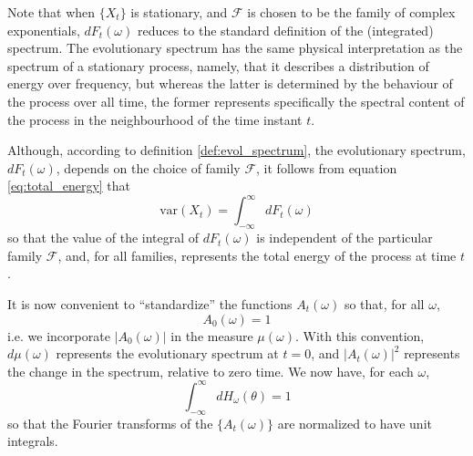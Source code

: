 \documentclass{article}
\begin{document}
Note that when $\{X_t \}$ is stationary, and $\mathscr{F}$ is chosen to be the
family of complex exponentials, $dF_t (\omega)$ reduces to the standard
definition of the (integrated) spectrum. The evolutionary spectrum has the
same physical interpretation as the spectrum of a stationary process, namely,
that it describes a distribution of energy over frequency, but whereas the
latter is determined by the behaviour of the process over all time, the former
represents specifically the spectral content of the process in the
neighbourhood of the time instant $t$.

Although, according to definition \eqref{def:evol_spectrum}, the evolutionary
spectrum, $dF_t (\omega)$, depends on the choice of family $\mathscr{F}$, it
follows from equation \eqref{eq:total_energy} that
\begin{equation}
  \label{eq:integral_spectrum} \mathrm{var} (X_t) = \int_{- \infty}^{\infty}
  dF_t (\omega)
\end{equation}
so that the value of the integral of $dF_t (\omega)$ is independent of the
particular family $\mathscr{F}$, and, for all families, represents the total
energy of the process at time $t$.

It is now convenient to ``standardize'' the functions $A_t (\omega)$ so that,
for all $\omega$,
\begin{equation}
  \label{eq:standardize} A_0 (\omega) = 1
\end{equation}
i.e. we incorporate $|A_0 (\omega) |$ in the measure $\mu (\omega)$. With this
convention, $d \mu (\omega)$ represents the evolutionary spectrum at $t = 0$,
and $|A_t (\omega) |^2$ represents the change in the spectrum, relative to
zero time. We now have, for each $\omega$,
\begin{equation}
  \label{eq:unit_integral} \int_{- \infty}^{\infty} dH_{\omega} (\theta) = 1
\end{equation}
so that the Fourier transforms of the $\{A_t (\omega)\}$ are normalized to
have unit integrals.
\end{document}
